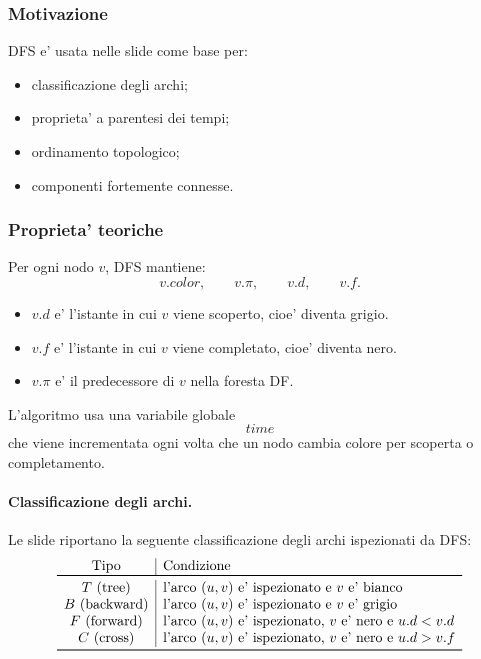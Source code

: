 \subsubsection{Motivazione}
DFS e' usata nelle slide come base per:
\begin{itemize}
	\item classificazione degli archi;
	\item proprieta' a parentesi dei tempi;
	\item ordinamento topologico;
	\item componenti fortemente connesse.
\end{itemize}

\subsubsection{Proprieta' teoriche}
Per ogni nodo $v$, DFS mantiene:
\[
v.color,\qquad v.\pi,\qquad v.d,\qquad v.f.
\]

\begin{itemize}
	\item $v.d$ e' l'istante in cui $v$ viene scoperto, cioe' diventa grigio.
	\item $v.f$ e' l'istante in cui $v$ viene completato, cioe' diventa nero.
	\item $v.\pi$ e' il predecessore di $v$ nella foresta DF.
\end{itemize}

L'algoritmo usa una variabile globale
\[
time
\]
che viene incrementata ogni volta che un nodo cambia colore per scoperta o completamento.

\paragraph{Classificazione degli archi.}
Le slide riportano la seguente classificazione degli archi ispezionati da DFS:
\[
\begin{array}{c|l}
\text{Tipo} & \text{Condizione} \\
\toprule
T\ \text{(tree)} & \text{l'arco }(u,v)\text{ e' ispezionato e }v\text{ e' bianco} \\
B\ \text{(backward)} & \text{l'arco }(u,v)\text{ e' ispezionato e }v\text{ e' grigio} \\
F\ \text{(forward)} & \text{l'arco }(u,v)\text{ e' ispezionato, }v\text{ e' nero e }u.d<v.d \\
C\ \text{(cross)} & \text{l'arco }(u,v)\text{ e' ispezionato, }v\text{ e' nero e }u.d>v.f \\
\bottomrule
\end{array}
\]

